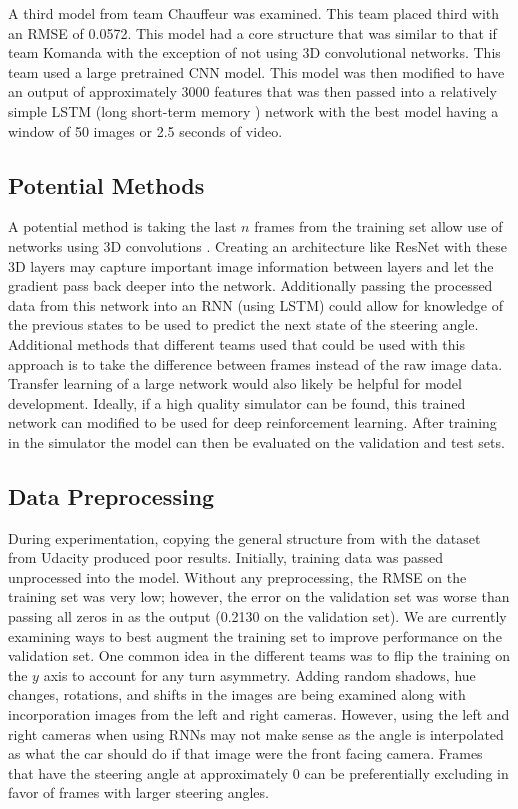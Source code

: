 \documentclass[10pt,twocolumn,letterpaper]{article}
\begin{document}
A third model from team Chauffeur was examined. This team placed third with an RMSE of 0.0572. This model had a core structure that was similar to that if team Komanda with the exception of not using 3D convolutional networks. This team used a large pretrained CNN model. This model was then modified to have an output of approximately 3000 features that was then passed into a relatively simple LSTM (long short-term memory \cite{hochreiter1997long}) network with the best model having a window of 50 images or 2.5 seconds of video.



\subsection{Potential Methods}

A potential method is taking the last $n$ frames from the training set allow use of networks using 3D convolutions \cite{Tran_2015_ICCV}. Creating an architecture like ResNet with these 3D layers may capture important image information between layers and let the gradient pass back deeper into the network. Additionally passing the processed data from this network into an RNN (using LSTM) could allow for knowledge of the previous states to be used to predict the next state of the steering angle. Additional methods that different teams used that could be used with this approach is to take the difference between frames instead of the raw image data. Transfer learning of a large network would also likely be helpful for model development. Ideally, if a high quality simulator can be found, this trained network can modified to be used for deep reinforcement learning. After training in the simulator the model can then be evaluated on the validation and test sets.

\subsection{Data Preprocessing}
During experimentation, copying the general structure from \cite{bojarski2016end} with the dataset from Udacity produced poor results. Initially, training data was passed unprocessed into the model. Without any preprocessing, the RMSE on the training set was very low; however, the error on the validation set was worse than passing all zeros in as the output (0.2130 on the validation set). We are currently examining ways to best augment the training set to improve performance on the validation set. One common idea in the different teams was to flip the training on the $y$ axis to account for any turn asymmetry. Adding random shadows, hue changes, rotations, and shifts in the images are being examined along with incorporation images from the left and right cameras. However, using the left and right cameras when using RNNs may not make sense as the angle is interpolated as what the car should do if that image were the front facing camera. Frames that have the steering angle at approximately 0 can be preferentially excluding in favor of frames with larger steering angles.
\end{document}
